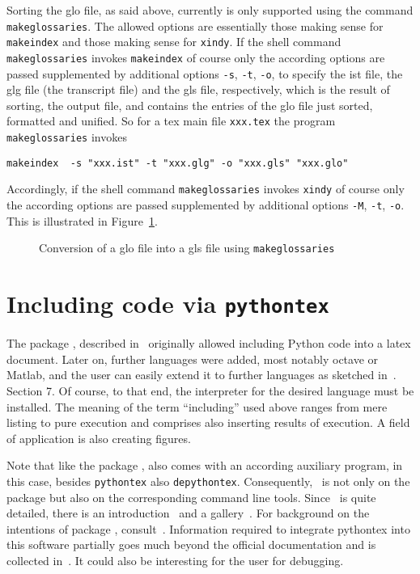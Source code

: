 Sorting the glo file, as said above, 
currently is only supported using the command \texttt{makeglossaries}. 
The allowed options are essentially those 
making sense for \texttt{makeindex} and those making sense for \texttt{xindy}. 
If the shell command \texttt{makeglossaries} 
invokes \texttt{makeindex} of course only the according options 
are passed supplemented by additional options 
\texttt{-s}, \texttt{-t}, \texttt{-o}, to specify the
ist file, the glg file (the transcript file) and the gls file,
respectively, 
which is the result of sorting, the output file, 
and contains the entries of the glo file 
just sorted, formatted and unified.
So for a tex main file \texttt{xxx.tex} the program 
\texttt{makeglossaries} invokes
%
\begin{verbatim}
makeindex  -s "xxx.ist" -t "xxx.glg" -o "xxx.gls" "xxx.glo"
\end{verbatim}
%
Accordingly, if the shell command \texttt{makeglossaries} 
invokes \texttt{xindy} of course only the according options 
are passed supplemented by additional options 
\texttt{-M}, \texttt{-t}, \texttt{-o}. 
This is illustrated in Figure~\ref{fig:glo2gls}. 


\begin{figure}[htb]
\centering
{}
\caption{\label{fig:glo2gls}Conversion of a glo file into a gls file 
using \texttt{makeglossaries}}
\end{figure}


\section{Including code via \texttt{pythontex}}\label{sec:pythontex}

The package , described in~\cite{PythonTexP} 
originally allowed including Python code into a latex document. 
Later on, further languages were added, most notably octave or Matlab, 
and the user can easily extend it to further languages 
as sketched in~\cite{PythonTexP}. Section 7. 
Of course, to that end, the interpreter for the desired language must be installed.
The meaning of the term ``including'' used above 
ranges from mere listing to pure execution and comprises also inserting results of execution. 
A field of application is also creating figures. 

Note that like the package , also  
comes with an according auxiliary program, 
in this case, besides \texttt{pythontex} also \texttt{depythontex}. 
Consequently,~\cite{PythonTexP} is not only on the package 
but also on the corresponding command line tools. 
Since~\cite{PythonTexP} is quite detailed, 
there is an introduction~\cite{PythonTexQ} and a gallery~\cite{PythonTexG}. 
For background on the intentions of package , consult~\cite{PythonTexRepr}. 
Information required to integrate pythontex into this software 
partially goes much beyond the official documentation and is collected in~\cite{PyTexInOut}. 
It could also be interesting for the user for debugging. 

